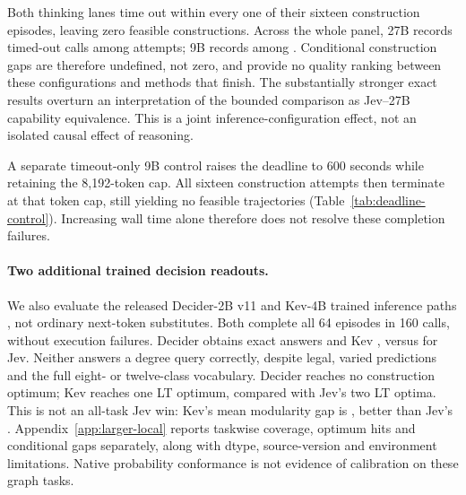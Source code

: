 Both thinking lanes time out within every one of their sixteen construction
episodes, leaving zero feasible constructions. Across the whole panel, 27B
records \EPLargeThinkingFailures{} timed-out calls among
\EPLargeThinkingCalls{} attempts; 9B records \EPSmallThinkingFailures{}
among \EPSmallThinkingCalls{}. Conditional construction gaps are therefore
undefined, not zero, and provide no quality ranking between these
configurations and methods that finish. The substantially stronger exact
results overturn an interpretation of the bounded comparison as
Jev--27B capability equivalence. This is a joint inference-configuration
effect, not an isolated causal effect of reasoning.

A separate timeout-only 9B control raises the deadline to 600 seconds while
retaining the 8,192-token cap. All sixteen construction attempts then terminate
at that token cap, still yielding no feasible trajectories
(Table~\ref{tab:deadline-control}). Increasing wall time alone therefore does
not resolve these completion failures.

\paragraph{Two additional trained decision readouts.}
We also evaluate the released Decider-2B v11 and Kev-4B trained inference
paths \cite{decider2026model,decider2026code,kev2026model,kev2026code},
not ordinary next-token substitutes. Both complete all 64 episodes in
160 calls, without execution failures. Decider obtains \EPDeciderExact{}
exact answers and Kev \EPKevExact{}, versus \EPJevExact{} for Jev.
Neither answers a degree query correctly, despite legal, varied predictions
and the full eight- or twelve-class vocabulary. Decider reaches no construction
optimum; Kev reaches one LT optimum, compared with Jev's two LT optima.
This is not an all-task Jev win: Kev's mean modularity gap is
\EPKevCommunityGap{}, better than Jev's \EPJevCommunityGap{}.
Appendix~\ref{app:larger-local} reports taskwise coverage, optimum hits and
conditional gaps separately, along with dtype, source-version and environment
limitations. Native probability conformance is not evidence of calibration
on these graph tasks.

